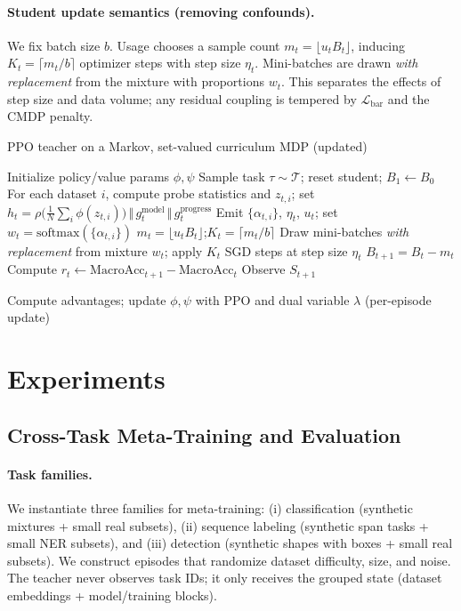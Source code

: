\documentclass[11pt]{article}
\newcommand{\MacroAcc}{\mathrm{MacroAcc}}
\newcommand{\1}{\mathbf{1}}
\begin{document}
\paragraph{Student update semantics (removing confounds).}
We fix batch size $b$.
Usage chooses a sample count $m_t=\lfloor u_t B_t\rfloor$, inducing $K_t=\lceil m_t/b\rceil$ optimizer steps with step size $\eta_t$.
Mini-batches are drawn \emph{with replacement} from the mixture with proportions $w_t$.
This separates the effects of step size and data volume; any residual coupling is tempered by $\mathcal{L}_{\text{bar}}$ and the CMDP penalty.

\begin{algorithm}[H]
\caption{PPO teacher on a Markov, set-valued curriculum MDP (updated)}
\label{alg:ppo}
\begin{algorithmic}[1]
\State Initialize policy/value params $\phi,\psi$
    \State Sample task $\tau\sim\mathcal{T}$; reset student; $B_1\leftarrow B_0$
      \State {}
      \State For each dataset $i$, compute probe statistics and $z_{t,i}$; set $h_t=\rho\!\big(\tfrac{1}{N}\sum_i \phi(z_{t,i})\big)\,\Vert\,g^{\text{model}}_t\,\Vert\,g^{\text{progress}}_t$
      \State Emit $\{\alpha_{t,i}\}$, $\eta_t$, $u_t$; set $w_t=\mathrm{softmax}(\{\alpha_{t,i}\})$
      \State $m_t=\lfloor u_t B_t\rfloor$;\quad $K_t=\lceil m_t/b\rceil$
      \State Draw mini-batches \emph{with replacement} from mixture $w_t$; apply $K_t$ SGD steps at step size $\eta_t$
      \State $B_{t+1}=B_t-m_t$
      \State Compute $r_t \leftarrow \MacroAcc_{t+1}-\MacroAcc_t$
      \State Observe $S_{t+1}$

    \EndFor
  \EndFor
  \State Compute advantages; update $\phi,\psi$ with PPO and dual variable $\lambda$ (per-episode update)
\EndFor
\end{algorithmic}
\end{algorithm}

\section{Experiments}
\subsection{Cross-Task Meta-Training and Evaluation}
\paragraph{Task families.}
We instantiate three families for meta-training: (i) classification (synthetic mixtures + small real subsets), (ii) sequence labeling (synthetic span tasks + small NER subsets), and (iii) detection (synthetic shapes with boxes + small real subsets). 
We construct episodes that randomize dataset difficulty, size, and noise. 
The teacher never observes task IDs; it only receives the grouped state (dataset embeddings + model/training blocks).
\end{document}
